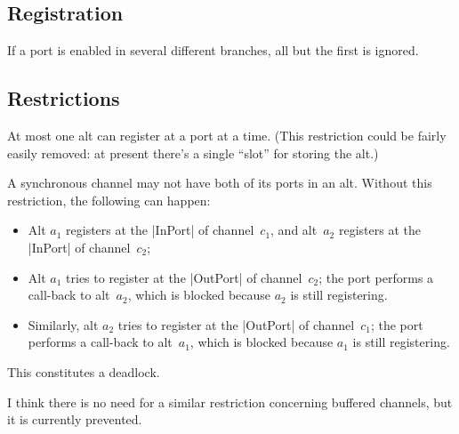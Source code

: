 \documentclass[12pt,a4paper]{article}
\begin{document}

\subsection*{Registration}

If a port is enabled in several different branches, all but the first is
ignored.



\subsection*{Restrictions}

At most one alt can register at a port at a time.  (This restriction could be
fairly easily removed: at present there's a single ``slot'' for storing the
alt.)


A synchronous channel may not have both of its ports in an alt.  Without this
restriction, the following can happen: 
\begin{itemize}
\item Alt $a_1$ registers at the |InPort| of channel~$c_1$, and alt~$a_2$
  registers at the |InPort| of channel~$c_2$;

\item Alt $a_1$ tries to register at the |OutPort| of channel~$c_2$; the port
  performs a call-back to alt~$a_2$, which is blocked because $a_2$ is still
  registering.

\item Similarly, alt $a_2$ tries to register at the |OutPort| of
  channel~$c_1$; the port performs a call-back to alt~$a_1$, which is blocked
  because $a_1$ is still registering.
\end{itemize}
%
This constitutes a deadlock. 

I think there is no need for a similar restriction concerning buffered
channels, but it is currently prevented. 
\end{document}
